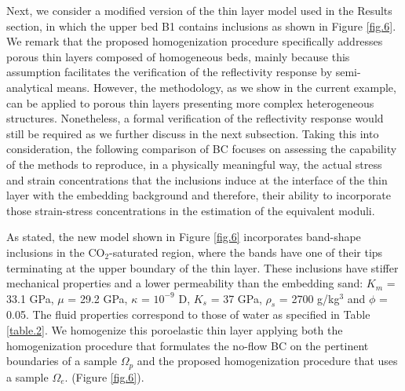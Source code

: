 \documentclass[draft]{agujournal2019}
\begin{document}
Next, we consider a modified version of the thin layer model used in the Results section, in which the upper bed B1 contains inclusions as shown in Figure \ref{fig.6}. We remark that the proposed homogenization procedure specifically addresses porous thin layers composed of homogeneous beds, mainly because this assumption facilitates the verification of the reflectivity response by semi-analytical means. However, the methodology, as we show in the current example, can be applied to porous thin layers presenting more complex heterogeneous structures. Nonetheless, a formal verification of the reflectivity response would still be required as we further discuss in the next subsection. Taking this into consideration, the following comparison of BC focuses on assessing the capability of the methods to reproduce, in a physically meaningful way, the actual stress and strain concentrations that the inclusions induce at the interface of the thin layer with the embedding background and therefore, their ability to incorporate those strain-stress concentrations in the estimation of the equivalent moduli.

As stated, the new model shown in Figure \ref{fig.6} incorporates band-shape inclusions in the CO$_2$-saturated region, where the bands have one of their tips terminating at the upper boundary of the thin layer. These inclusions have stiffer mechanical properties and a lower permeability than the embedding sand: $K_m$ = 33.1 GPa,  $\mu$ = 29.2 GPa, $\kappa$ = $10^{-9}$ D, $K_s$ = 37 GPa, $\rho_s$ = 2700 g/kg$^3$ and $\phi$ = 0.05. The fluid properties correspond to those of water as specified in Table \ref{table.2}. We homogenize this poroelastic thin layer applying both the homogenization procedure that formulates the no-flow BC on the pertinent boundaries of a sample $\Omega_p$  and the proposed homogenization procedure that uses a sample $\Omega_e$. (Figure \ref{fig.6}).
\end{document}
